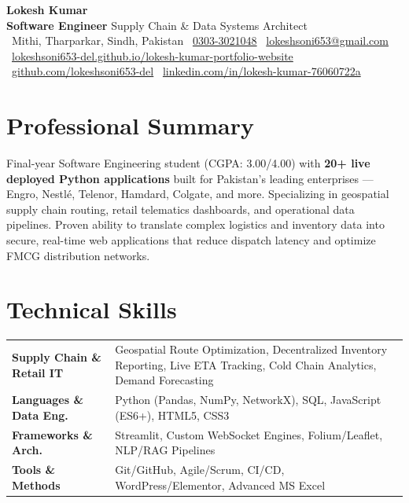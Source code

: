 \documentclass[10pt, a4paper]{article}
\begin{document}
\color{dark}

\begin{center}
  {\LARGE\bfseries Lokesh Kumar}\\[3pt]
  {\small\color{muted}
    \textbf{Software Engineer} \textemdash{} Supply Chain \& Data Systems Architect\\[3pt]
    \faMapMarker*~Mithi, Tharparkar, Sindh, Pakistan \enspace
    \faPhone*~\href{tel:+923033021048}{0303-3021048} \enspace
    \faEnvelope~\href{mailto:lokeshsoni653@gmail.com}{lokeshsoni653@gmail.com}\\[2pt]
    \faGlobe~\href{https://lokeshsoni653-del.github.io/lokesh-kumar-portfolio-website/}%
      {lokeshsoni653-del.github.io/lokesh-kumar-portfolio-website} \enspace
    \faGithub~\href{https://github.com/lokeshsoni653-del}{github.com/lokeshsoni653-del} \enspace
    \faLinkedin~\href{https://www.linkedin.com/in/lokesh-kumar-76060722a}{linkedin.com/in/lokesh-kumar-76060722a}
  }
\end{center}

\vspace{-2pt}

\section{Professional Summary}
Final-year Software Engineering student (CGPA: 3.00/4.00) with \textbf{20+ live deployed Python applications} built for Pakistan's leading enterprises — Engro, Nestlé, Telenor, Hamdard, Colgate, and more. Specializing in geospatial supply chain routing, retail telematics dashboards, and operational data pipelines. Proven ability to translate complex logistics and inventory data into secure, real-time web applications that reduce dispatch latency and optimize FMCG distribution networks.

\section{Technical Skills}
\begin{tabular}{@{}lp{13.2cm}@{}}
  \textbf{Supply Chain \& Retail IT} & Geospatial Route Optimization, Decentralized Inventory Reporting, Live ETA Tracking, Cold Chain Analytics, Demand Forecasting\\[2pt]
  \textbf{Languages \& Data Eng.}    & Python (Pandas, NumPy, NetworkX), SQL, JavaScript (ES6+), HTML5, CSS3\\[2pt]
  \textbf{Frameworks \& Arch.}       & Streamlit, Custom WebSocket Engines, Folium/Leaflet, NLP/RAG Pipelines\\[2pt]
  \textbf{Tools \& Methods}          & Git/GitHub, Agile/Scrum, CI/CD, WordPress/Elementor, Advanced MS Excel\\
\end{tabular}
\end{document}
